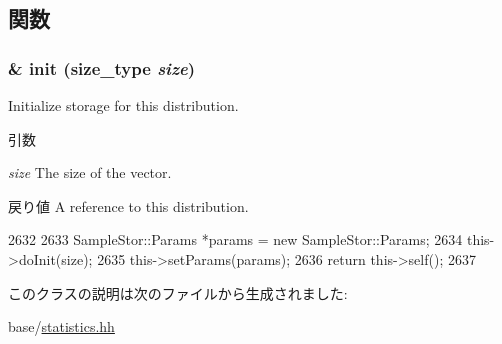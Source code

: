 \subsection{関数}
\hypertarget{classStats_1_1VectorStandardDeviation_a23d45b8c43c8a8387cff800fd35492d9}{
\subsubsection[{init}]{\& init ({\bf size\_\-type} {\em size})}}
\label{classStats_1_1VectorStandardDeviation_a23d45b8c43c8a8387cff800fd35492d9}
Initialize storage for this distribution. 
\begin{DoxyParams}{引数}
\item[{\em size}]The size of the vector. \end{DoxyParams}
\begin{DoxyReturn}{戻り値}
A reference to this distribution. 
\end{DoxyReturn}



\begin{DoxyCode}
2632     {
2633         SampleStor::Params *params = new SampleStor::Params;
2634         this->doInit(size);
2635         this->setParams(params);
2636         return this->self();
2637     }
\end{DoxyCode}


このクラスの説明は次のファイルから生成されました:\begin{DoxyCompactItemize}
\item 
base/\hyperlink{statistics_8hh}{statistics.hh}\end{DoxyCompactItemize}
